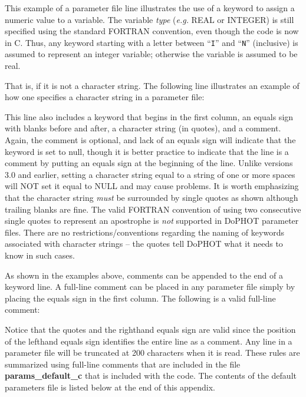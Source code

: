 This example of a parameter file line illustrates the use of a
keyword to assign a numeric
value to a variable.  The variable {\it type} ({\it e.g.} REAL or INTEGER)
is still specified using the standard FORTRAN convention, even though
the code is now in C.  Thus, any keyword starting with a
letter between ``{\tt I}'' and ``{\tt N}'' (inclusive) is assumed
to represent an integer variable; otherwise the variable is 
assumed to be real.

That is, if it is not a character string.  The following line illustrates
an example of how one specifies a character string in a parameter
file:


\noindent This line also includes a keyword that
begins in the first column, an equals sign with blanks before
and after, a character string (in quotes),
and a comment.  Again, the comment is optional, and lack of an equals sign
will indicate that the keyword is set to null, though it is better practice to
indicate that the line is a comment by putting an equals sign at the beginning
of the line. Unlike versions 3.0 and earlier, setting a character string equal to
a string of one or more spaces will NOT set it equal to NULL and may cause 
problems.  It is worth emphasizing that the character string {\it must} be 
surrounded by single quotes as shown although trailing blanks are fine.  
The valid FORTRAN convention of using two consecutive single quotes to 
represent an apostrophe is {\it not} supported in DoPHOT parameter files.  
There are no restrictions/conventions regarding the naming of keywords 
associated with character strings -- the quotes tell DoPHOT what it needs to 
know in such cases.

As shown in the examples above, comments can be appended to the end of 
a keyword line.  A full-line comment can be placed in any parameter file simply 
by placing the equals sign in the first column.  The following is a valid full-line 
comment:


\noindent Notice that the quotes and the righthand equals sign are valid since
the position of the lefthand equals sign identifies the entire line as a
comment.  Any line in a parameter file will be truncated at 200 characters when 
it is read.   These rules are summarized using full-line comments that are 
included in the file {\bf params\_default\_c} that is included with the code.  The
contents of the default parameters file is listed below at the end of
this appendix.

